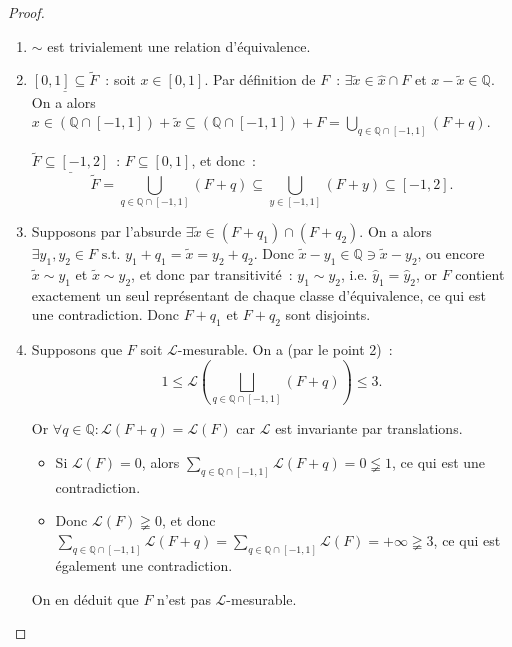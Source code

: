 \documentclass{article}
\theoremstyle{definition}
\newcommand{\pinfty}{{+\infty}}
\newcommand{\st}{\text{ s.t. }}
\newcommand{\Q}{{\mathbb Q}}
\begin{document}
\begin{proof}~
\begin{enumerate}
	\item $\sim$ est trivialement une relation d'équivalence.
	\item $\underline {[0, 1] \subseteq \tilde F}$~: soit $x \in [0, 1]$. Par définition de $F$~: $\exists \tilde x \in \hat x \cap F$ et $x-\tilde x \in \Q$.
	On a alors $x \in (\Q \cap [-1, 1]) + \tilde x \subseteq (\Q \cap [-1, 1]) + F = \bigcup_{q \in \Q \cap [-1, 1]}(F+q)$.

	$\underline {\tilde F \subseteq [-1, 2]}$~: $F \subseteq [0, 1]$, et donc~:
	\[\tilde F = \bigcup_{q \in \Q \cap [-1, 1]}(F+q) \subseteq \bigcup_{y \in [-1, 1]}(F+y) \subseteq [-1, 2].\]
	\item Supposons par l'absurde $\exists \tilde x \in (F+q_1) \cap (F+q_2)$. On a alors $\exists y_1, y_2 \in F \st y_1+q_1 = \tilde x = y_2+q_2$. Donc
	$\tilde x - y_1 \in \Q \ni \tilde x - y_2$, ou encore $\tilde x \sim y_1$ et $\tilde x \sim y_2$, et donc par transitivité~: $y_1 \sim y_2$, i.e. $\hat y_1 = \hat y_2$,
	or $F$ contient exactement un seul représentant de chaque classe d'équivalence, ce qui est une contradiction. Donc $F+q_1$ et $F+q_2$ sont disjoints.
	\item Supposons que $F$ soit $\mathcal L$-mesurable. On a (par le point 2)~:
	\[1 \leq \mathcal L\left(\bigsqcup_{q \in \Q \cap [-1, 1]}(F+q)\right) \leq 3.\]

	Or $\forall q \in \Q : \mathcal L(F+q) = \mathcal L(F)$ car $\mathcal L$ est invariante par translations.
	\begin{itemize}
		\item Si $\mathcal L(F) = 0$, alors $\sum_{q \in \Q \cap [-1, 1]}\mathcal L(F+q) = 0 \lneqq 1$, ce qui est une contradiction.
		\item Donc $\mathcal L(F) \gneqq 0$, et donc $\sum_{q \in \Q \cap [-1, 1]}\mathcal L(F+q) = \sum_{q \in \Q \cap [-1, 1]}\mathcal L(F) = \pinfty \gneqq 3$, ce qui est également
		une contradiction.
	\end{itemize}

	On en déduit que $F$ n'est pas $\mathcal L$-mesurable.
\end{enumerate}
\end{proof}
\end{document}
